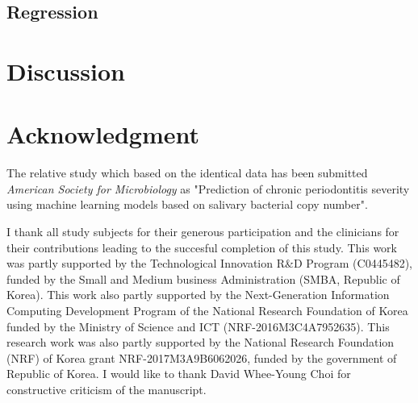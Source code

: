 \documentclass[aps, 11pt, a4paper]{article}
\begin{document}
    	\subsection{Regression}
    
    \section{Discussion}
    
    \section{Acknowledgment}
    	The relative study which based on the identical data has been submitted \textit{American Society for Microbiology} as "Prediction of chronic periodontitis severity using machine learning models based on salivary bacterial copy number". 
    	
    	I thank all study subjects for their generous participation and the clinicians for their contributions leading to the succesful completion of this study. This work was partly supported by the Technological Innovation R\&D Program (C0445482), funded by the Small and Medium business Administration (SMBA, Republic of Korea). This work also partly supported by the Next-Generation Information Computing Development Program of the National Research Foundation of Korea funded by the Ministry of Science and ICT (NRF-2016M3C4A7952635). This research work was also partly supported by the National Research Foundation (NRF) of Korea grant NRF-2017M3A9B6062026, funded by the government of Republic of Korea. I would like to thank David Whee-Young Choi for constructive criticism of the manuscript. 
    
    
    
\end{document}

